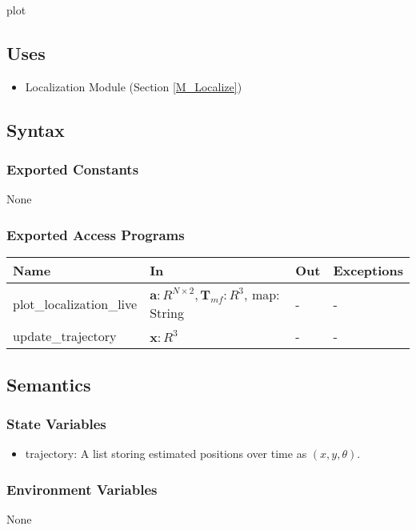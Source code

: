 \documentclass[12pt, titlepage]{article}
\begin{document}
plot 

\subsection{Uses}
\begin{itemize}
  \item Localization Module (Section \ref{M_Localize})
\end{itemize}

\subsection{Syntax}

\subsubsection{Exported Constants}
None

\subsubsection{Exported Access Programs}

\begin{center}
\begin{tabular}{p{4cm} p{6cm} p{4cm} p{2cm}}
\hline
\textbf{Name} & \textbf{In} & \textbf{Out} & \textbf{Exceptions} \\
\hline
plot\_localization\_live & $\mathbf{a}: R^{N \times 2}, \mathbf{T}_{mf}: R^3$, map: String  & - & - \\
\hline
update\_trajectory &  $\hat{\mathbf{x}}: R^3$ & - & - \\
\hline
\end{tabular}
\end{center}

\subsection{Semantics}

\subsubsection{State Variables}
\begin{itemize}
  \item trajectory: A list storing estimated positions over time as $(x, y, \theta)$.
\end{itemize}

\subsubsection{Environment Variables}
None
\end{document}
